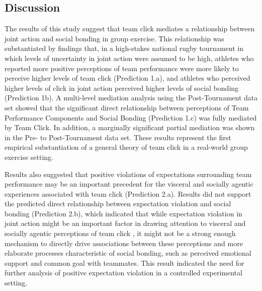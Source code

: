 \begin{CJK}{UTF8}{gbsn}
\clearpage

\section{Discussion\label{sect:tournamentDiscussion}}
The results of this study suggest that team click mediates a relationship between joint action and social bonding in group exercise.  This relationship was substantiated by findings that, in a high-stakes national rugby tournament in which levels of uncertainty in joint action were assumed to be high, athletes who reported more positive perceptions of team performance were more likely to perceive higher levels of team click (Prediction 1.a), and athletes who perceived higher levels of click in joint action perceived higher levels of social bonding (Prediction 1b).  A multi-level mediation analysis using the Post-Tournament data set showed that the significant direct relationship between perceptions of Team Performance Components and Social Bonding (Prediction 1.c) was fully mediated by Team Click. In addition, a marginally significant partial mediation was shown in the Pre- to Post-Tournament data set.  These results represent the first empirical substantiation of a general theory of team click in a real-world group exercise setting.


Results also suggested that positive violations of expectations surrounding team performance may be an important precedent for the visceral and socially agentic experiences associated with team click (Prediction 2.a).  Results did not support the predicted direct relationship between expectation violation and social bonding (Prediction 2.b), which indicated that while expectation violation in joint action might be an important factor in drawing attention to visceral and socially agentic perceptions of team click \citep{Chetverikov2014}, it might not be a strong enough mechanism to directly drive associations between these perceptions and more elaborate processes characteristic of social bonding, such as perceived emotional support and common goal with teammates. This result indicated the need for further analysis of positive expectation violation in a controlled experimental setting.


\end{CJK}
